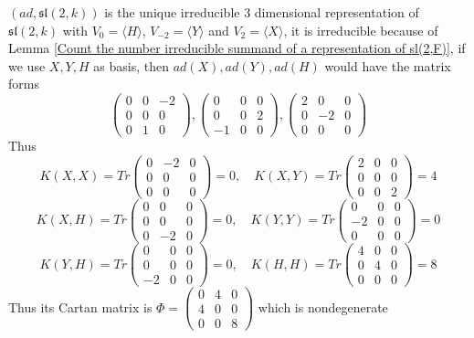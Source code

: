 \documentclass[main]{subfiles}
\begin{document}
\begin{example}\label{Adjoint representation of sl(2,F) is the unique 3 dimensional irreducible representation}
$(ad,\mathfrak{sl}(2,k))$ is the unique irreducible $3$ dimensional representation of $\mathfrak{sl}(2,k)$ with $V_0=\langle H\rangle$, $V_{-2}=\langle Y\rangle$ and $V_2=\langle X\rangle$, it is irreducible because of Lemma \ref{Count the number irreducible summand of a representation of sl(2,F)}, if we use $X,Y,H$ as basis, then $ad(X),ad(Y),ad(H)$ would have the matrix forms 
$$\begin{pmatrix}
0&0&-2 \\
0&0&0 \\
0&1&0
\end{pmatrix},\begin{pmatrix}
0&0&0\\
0&0&2 \\
-1&0&0
\end{pmatrix},\begin{pmatrix}
2&0&0 \\
0&-2&0 \\
0&0&0
\end{pmatrix}$$ Thus
$$K(X,X)=Tr\begin{pmatrix}
0&-2&0 \\
0&0&0 \\
0&0&0
\end{pmatrix}=0,\quad K(X,Y)=Tr\begin{pmatrix}
2&0&0 \\
0&0&0 \\
0&0&2
\end{pmatrix}=4$$$$K(X,H)=Tr\begin{pmatrix}
0&0&0 \\
0&0&0 \\
0&-2&0
\end{pmatrix}=0,\quad K(Y,Y)=Tr\begin{pmatrix}
0&0&0 \\
-2&0&0 \\
0&0&0
\end{pmatrix}=0$$$$K(Y,H)=Tr\begin{pmatrix}
0&0&0 \\
0&0&0 \\
-2&0&0
\end{pmatrix}=0,\quad K(H,H)=Tr\begin{pmatrix}
4&0&0 \\
0&4&0 \\
0&0&0
\end{pmatrix}=8$$Thus its Cartan matrix is $\Phi=\begin{pmatrix}
0&4&0 \\
4&0&0 \\
0&0&8
\end{pmatrix}$ which is nondegenerate
\end{example}
\end{document}
